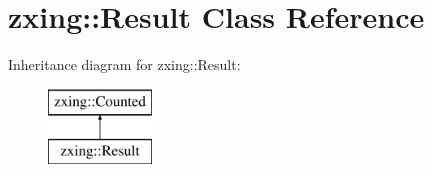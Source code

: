 \hypertarget{classzxing_1_1_result}{}\section{zxing\+:\+:Result Class Reference}
\label{classzxing_1_1_result}
Inheritance diagram for zxing\+:\+:Result\+:\begin{figure}[H]
\begin{center}
\leavevmode
\includegraphics[height=2.000000cm]{classzxing_1_1_result}
\end{center}
\end{figure}
